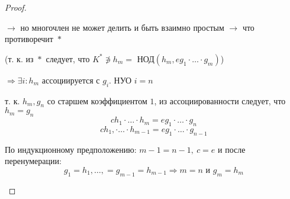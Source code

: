 \begin{proof}
\begin{enumerate}
            \par \quad $\rightarrow$ но многочлен не может делить и быть взаимно простым $\rightarrow$ что противоречит $\boxed{*}$ %
            \par \quad (т. к. из $\boxed{*}$ следует, что $K^* \not \ni h_m = $ НОД$(h_m, eg_1 \cdot \ldots \cdot g_m)$)
            \par \quad $\Rightarrow \exists i : h_m$ ассоциируется с $g_i$. НУО $i = n$
            \par \quad т. к. $h_m, g_n$ со старшем коэффициентом $1$, из ассоциированности следует, что $h_m = g_n$
            \[
                ch_1 \cdot \ldots \cdot h_m = eg_1 \cdot \ldots \cdot g_n    
            \]
            \[
                ch_1, \cdot \ldots \cdot h_{m-1} = eg_1 \cdot \ldots \cdot g_{n-1}
            \]
            \par \quad По индукционному предположению: $m-1 = n-1, \ c = e$ и после перенумерации:
            \[
                g_1 = h_1, \dots, = g_{m-1} = h_{m-1} \Rightarrow m = n \text{ и } g_m = h_m    
            \]
        \end{enumerate}
    \end{proof}

